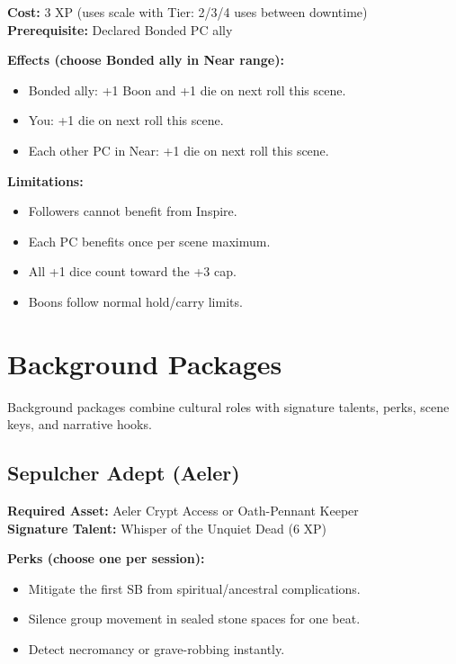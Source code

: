\textbf{Cost:} 3 XP (uses scale with Tier: 2/3/4 uses between downtime)\\
\textbf{Prerequisite:} Declared Bonded PC ally

\textbf{Effects (choose Bonded ally in Near range):}
\begin{itemize}
\item Bonded ally: +1 Boon and +1 die on next roll this scene.
\item You: +1 die on next roll this scene.
\item Each other PC in Near: +1 die on next roll this scene.
\end{itemize}

\textbf{Limitations:}
\begin{itemize}
\item Followers cannot benefit from Inspire.
\item Each PC benefits once per scene maximum.
\item All +1 dice count toward the +3 cap.
\item Boons follow normal hold/carry limits.
\end{itemize}

\section{Background Packages}
\label{sec:background-packages}

Background packages combine cultural roles with signature talents, perks, scene keys, and narrative hooks.

\subsection{Sepulcher Adept (Aeler)}
\label{subsec:sepulcher-adept}

\textbf{Required Asset:} Aeler Crypt Access or Oath-Pennant Keeper\\
\textbf{Signature Talent:} Whisper of the Unquiet Dead (6 XP)

\textbf{Perks (choose one per session):}
\begin{itemize}
\item Mitigate the first SB from spiritual/ancestral complications.
\item Silence group movement in sealed stone spaces for one beat.
\item Detect necromancy or grave-robbing instantly.
\end{itemize}

